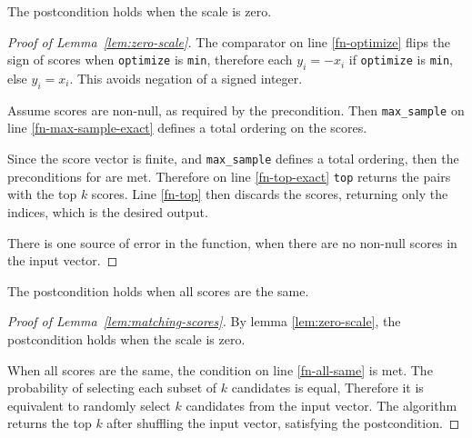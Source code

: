 \documentclass{article}
\begin{document}
\begin{lemma}
    \label{lem:zero-scale}
    The postcondition holds when the scale is zero.
\end{lemma}

\begin{proof}[Proof of Lemma~\ref{lem:zero-scale}]
    The comparator on line \ref{fn-optimize} flips the sign of scores when \texttt{optimize} is \texttt{min},
    therefore each $y_i = -x_i$ if \texttt{optimize} is \texttt{min}, else $y_i = x_i$.
    This avoids negation of a signed integer.

    Assume scores are non-null, as required by the precondition.
    Then \texttt{max\_sample} on line \ref{fn-max-sample-exact} defines a total ordering on the scores.

    Since the score vector is finite, and \texttt{max\_sample} defines a total ordering,
    then the preconditions for  are met.
    Therefore on line \ref{fn-top-exact} \texttt{top} returns the pairs with the top $k$ scores.
    Line \ref{fn-top} then discards the scores, returning only the indices,
    which is the desired output.

    There is one source of error in the function,
    when there are no non-null scores in the input vector.
\end{proof}

\begin{lemma}
    \label{lem:matching-scores}
    The postcondition holds when all scores are the same.
\end{lemma}

\begin{proof}[Proof of Lemma~\ref{lem:matching-scores}]
    By lemma \ref{lem:zero-scale}, the postcondition holds when the scale is zero.

    When all scores are the same, the condition on line \ref{fn-all-same} is met.
    The probability of selecting each subset of $k$ candidates is equal,
    Therefore it is equivalent to randomly select $k$ candidates from the input vector.
    The algorithm returns the top $k$ after shuffling the input vector,
    satisfying the postcondition.
\end{proof}
\end{document}
